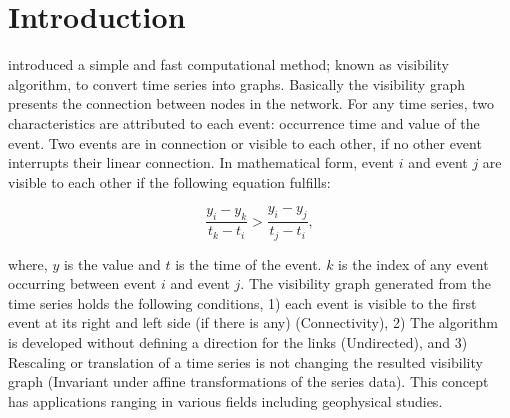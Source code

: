 
\section{Introduction}
\noindent
\citet{Lacasa2008} introduced a simple and fast computational method; known as visibility algorithm, to convert time series into graphs. Basically the visibility graph presents the connection between nodes in the network. For any time series, two characteristics are attributed to each event: occurrence time and value of the event. Two events are in connection or visible to each other, if no other event interrupts their linear connection. In mathematical form, event $i$ and event $j$ are visible to each other if the following equation fulfills:

\begin{equation}
\frac{y_i - y_k }{t_k - t_i} > \frac{y_i - y_j}{ t_j - t_i} ,
\end{equation}

\noindent
where, $y$ is the value and $t$ is the time of the event. $k$ is the index of any event occurring between event $i$ and event $j$. The visibility graph generated from the time series holds the following conditions, 1) each event is visible to the first event at its right and left side (if there is any) (Connectivity), 2) The algorithm is developed without defining a direction for the links (Undirected),  and 3) Rescaling or translation of a time series is not changing the resulted visibility graph (Invariant under affine transformations of  the series data)\citep{Lacasa2008}. This concept has applications ranging in various fields including geophysical studies.

